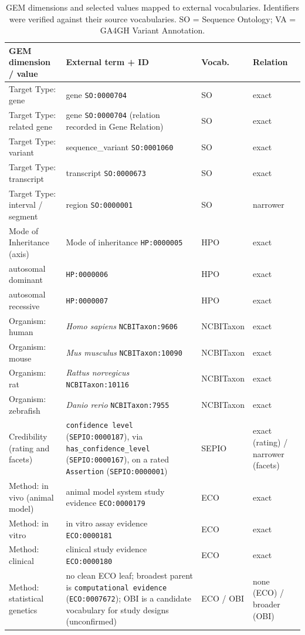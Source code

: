 \begin{table}[H]
  \centering
  \footnotesize
  \caption[Crosswalk: dimensions and values]{GEM dimensions and selected
  values mapped to external vocabularies. Identifiers were verified against
  their source vocabularies. SO = Sequence Ontology; VA = GA4GH Variant
  Annotation.}
  \label{tab:xwalk-dimensions}
  \begin{tabularx}{\linewidth}{@{}>{\raggedright\arraybackslash}X >{\raggedright\arraybackslash}X l >{\raggedright\arraybackslash}X@{}}
    \toprule
    GEM dimension / value & External term + ID & Vocab. & Relation \\
    \midrule
        Target Type: gene & gene \texttt{SO:0000704} & SO & exact \\
        Target Type: related gene & gene \texttt{SO:0000704} (relation recorded in Gene Relation) & SO & exact \\
        Target Type: variant & sequence\_variant \texttt{SO:0001060} & SO & exact \\
        Target Type: transcript & transcript \texttt{SO:0000673} & SO & exact \\
        Target Type: interval / segment & region \texttt{SO:0000001} & SO & narrower \\
        Mode of Inheritance (axis) & Mode of inheritance \texttt{HP:0000005} & HPO & exact \\
        \quad autosomal dominant & \texttt{HP:0000006} & HPO & exact \\
        \quad autosomal recessive & \texttt{HP:0000007} & HPO & exact \\
        Organism: human & \textit{Homo sapiens} \texttt{NCBITaxon:9606} & NCBITaxon & exact \\
        Organism: mouse & \textit{Mus musculus} \texttt{NCBITaxon:10090} & NCBITaxon & exact \\
        Organism: rat & \textit{Rattus norvegicus} \texttt{NCBITaxon:10116} & NCBITaxon & exact \\
        Organism: zebrafish & \textit{Danio rerio} \texttt{NCBITaxon:7955} & NCBITaxon & exact \\
        Credibility (rating and facets) & \texttt{confidence level} (\texttt{SEPIO:0000187}), via \texttt{has\_confidence\_level} (\texttt{SEPIO:0000167}), on a rated \texttt{Assertion} (\texttt{SEPIO:0000001}) & SEPIO & exact (rating) / narrower (facets) \\
        Method: in vivo (animal model) & animal model system study evidence \texttt{ECO:0000179} & ECO & exact \\
        Method: in vitro & in vitro assay evidence \texttt{ECO:0000181} & ECO & exact \\
        Method: clinical & clinical study evidence \texttt{ECO:0000180} & ECO & exact \\
        Method: statistical genetics & no clean ECO leaf; broadest parent is \texttt{computational evidence} (\texttt{ECO:0007672}); OBI is a candidate vocabulary for study designs (unconfirmed) & ECO / OBI & none (ECO) / broader (OBI) \\
    \bottomrule
  \end{tabularx}
\end{table}

